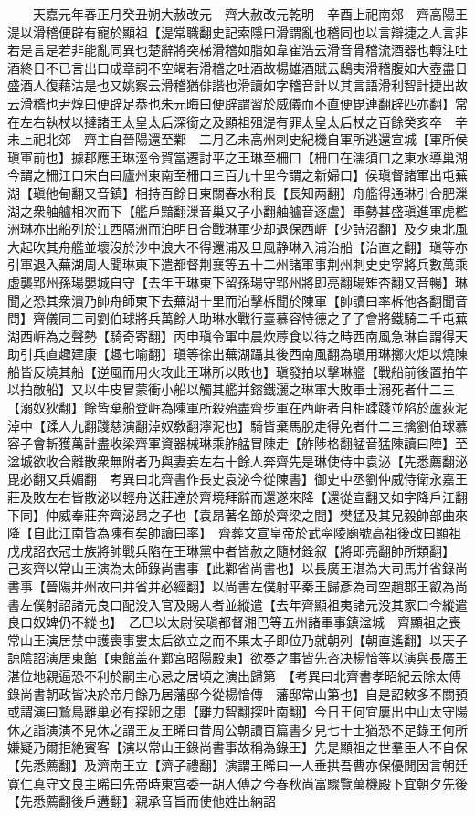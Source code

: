 　　天嘉元年春正月癸丑朔大赦改元　齊大赦改元乾明　辛酉上祀南郊　齊高陽王湜以滑稽便辟有寵於顯祖【湜常職翻史記索隱曰滑謂亂也稽同也以言辯捷之人言非若是言是若非能亂同異也楚辭將突梯滑稽如脂如韋崔浩云滑音骨稽流酒器也轉注吐酒終日不已言出口成章詞不空竭若滑稽之吐酒故楊雄酒賦云鴟夷滑稽腹如大壺盡日盛酒人復藉沽是也又姚察云滑稽猶俳諧也滑讀如字稽音計以其言語滑利智計捷出故云滑稽也尹焞曰便辟足恭也朱元晦曰便辟謂習於威儀而不直便毘連翻辟匹亦翻】常在左右執杖以撻諸王太皇太后深銜之及顯祖殂湜有罪太皇太后杖之百餘癸亥卒　辛未上祀北郊　齊主自晉陽還至鄴　二月乙未高州刺史紀機自軍所逃還宣城【軍所侯瑱軍前也】據郡應王琳涇令賀當遷討平之王琳至柵口【柵口在濡須口之東水導巢湖今謂之柵江口宋白曰廬州東南至柵口三百九十里今謂之新婦口】侯瑱督諸軍出屯蕪湖【瑱他甸翻又音鎮】相持百餘日東關春水稍長【長知两翻】舟艦得通琳引合肥漅湖之衆舳艫相次而下【艦戶黯翻漅音巢又子小翻舳艫音逐盧】軍勢甚盛瑱進軍虎檻洲琳亦出船列於江西隔洲而泊明日合戰琳軍少却退保西㟁【少詩沼翻】及夕東北風大起吹其舟艦並壞沒於沙中浪大不得還浦及旦風静琳入浦治船【治直之翻】瑱等亦引軍退入蕪湖周人聞琳東下遣都督荆襄等五十二州諸軍事荆州刺史史寜將兵數萬乘虛襲郢州孫瑒嬰城自守【去年王琳東下留孫瑒守郢州將即亮翻瑒雉杏翻又音暢】琳聞之恐其衆潰乃帥舟師東下去蕪湖十里而泊擊柝聞於陳軍【帥讀曰率柝他各翻聞音問】齊儀同三司劉伯球將兵萬餘人助琳水戰行臺慕容恃德之子子會將鐵騎二千屯蕪湖西㟁為之聲勢【騎奇寄翻】丙申瑱令軍中晨炊蓐食以待之時西南風急琳自謂得天助引兵直趣建康【趣七喻翻】瑱等徐出蕪湖躡其後西南風翻為瑱用琳擲火炬以燒陳船皆反燒其船【逆風而用火攻此王琳所以敗也】瑱發拍以擊琳艦【戰船前後置拍竿以拍敵船】又以牛皮冒蒙衝小船以觸其艦并鎔鐵灑之琳軍大敗軍士溺死者什二三【溺奴狄翻】餘皆棄船登㟁為陳軍所殺殆盡齊步軍在西㟁者自相蹂踐並陷於蘆荻泥淖中【蹂人九翻踐慈演翻淖奴敎翻濘泥也】騎皆棄馬脫走得免者什二三擒劉伯球慕容子會斬獲萬計盡收梁齊軍資器械琳乘舴艋冒陳走【舴陟格翻艋音猛陳讀曰陣】至湓城欲收合離散衆無附者乃與妻妾左右十餘人奔齊先是琳使侍中袁泌【先悉薦翻泌毘必翻又兵媚翻　考異曰北齊書作長史袁泌今從陳書】御史中丞劉仲威侍衛永嘉王莊及敗左右皆散泌以輕舟送莊達於齊境拜辭而還遂來降【還從宣翻又如字降戶江翻下同】仲威奉莊奔齊泌昂之子也【袁昂著名節於齊梁之間】樊猛及其兄毅帥部曲來降【自此江南皆為陳有矣帥讀曰率】　齊葬文宣皇帝於武寜陵廟號高祖後改曰顯祖　戊戌詔衣冠士族將帥戰兵陷在王琳黨中者皆赦之隨材銓叙【將即亮翻帥所類翻】　己亥齊以常山王演為太師錄尚書事【此鄴省尚書也】以長廣王湛為大司馬并省錄尚書事【晉陽并州故曰并省并必經翻】以尚書左僕射平秦王歸彥為司空趙郡王叡為尚書左僕射詔諸元良口配没入官及賜人者並縱遣【去年齊顯祖夷諸元没其家口今縱遣良口奴婢仍不縱也】　乙巳以太尉侯瑱都督湘巴等五州諸軍事鎮湓城　齊顯祖之喪常山王演居禁中護喪事婁太后欲立之而不果太子即位乃就朝列【朝直遙翻】以天子諒隂詔演居東館【東館盖在鄴宮昭陽殿東】欲奏之事皆先咨决楊愔等以演與長廣王湛位地親逼恐不利於嗣主心忌之居頃之演出歸第　【考異曰北齊書孝昭紀云除太傅錄尚書朝政皆决於帝月餘乃居藩邸今從楊愔傳　藩邸常山第也】自是詔敕多不關預或謂演曰鷙鳥離巢必有探卵之患【離力智翻探吐南翻】今日王何宜屢出中山太守陽休之詣演演不見休之謂王友王晞曰昔周公朝讀百篇書夕見七十士猶恐不足錄王何所嫌疑乃爾拒絶賓客【演以常山王錄尚書事故稱為錄王】先是顯祖之世羣臣人不自保【先悉薦翻】及濟南王立【濟子禮翻】演謂王晞曰一人垂拱吾曹亦保優閒因言朝廷寛仁真守文良主晞曰先帝時東宫委一胡人傅之今春秋尚富驟覽萬機殿下宜朝夕先後【先悉薦翻後戶遘翻】親承音旨而使他姓出納詔